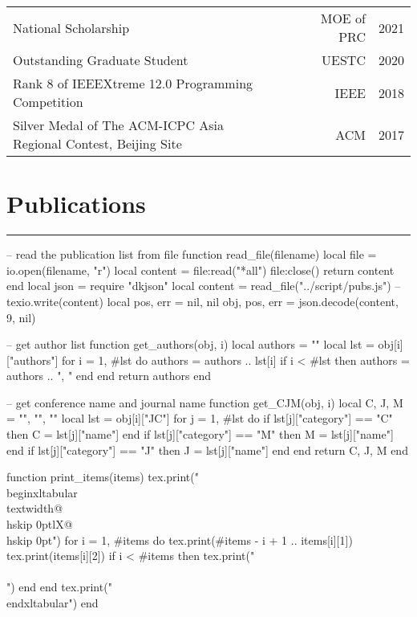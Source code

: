 \documentclass{article}
\begin{document}
\begin{tabularx}{\textwidth}{@{\hskip 0pt}lXr@{\hskip 1em}r@{\hskip 0pt}}
  National Scholarship & & MOE of PRC & 2021  \\
  Outstanding Graduate Student & & UESTC & 2020 \\
  Rank 8 of IEEEXtreme 12.0 Programming Competition & & IEEE & 2018 \\
  Silver Medal of The ACM-ICPC Asia Regional Contest, Beijing Site & & ACM & 2017
\end{tabularx}

\section*{Publications}
\vspace{-1em} \hrule \vspace{1em}

\begin{luacode}
  -- read the publication list from file
  function read_file(filename)
    local file = io.open(filename, "r")
    local content = file:read("*all")
    file:close()
    return content
  end
  local json = require "dkjson"
  local content = read_file("../script/pubs.js")
  -- texio.write(content)
  local pos, err = nil, nil
  obj, pos, err = json.decode(content, 9, nil)
\end{luacode}


\begin{luacode}
  -- get author list
  function get_authors(obj, i) 
    local authors = ""
    local lst = obj[i]["authors"]
    for i = 1, #lst do
      authors = authors .. lst[i]
      if i < #lst then
        authors = authors .. ", "
      end
    end
    return authors
  end

  -- get conference name and journal name
  function get_CJM(obj, i)
    local C, J, M = "", "", "" 
    local lst = obj[i]["JC"]
    for j = 1, #lst do
      if lst[j]["category"] == "C" then
        C = lst[j]["name"]
      end
      if lst[j]["category"] == "M" then
        M = lst[j]["name"]
      end
      if lst[j]["category"] == "J" then
        J = lst[j]["name"]
      end
    end
    return C, J, M
  end

  function print_items(items)
    tex.print("\\begin{xltabular}{\\textwidth}{@{\\hskip 0pt}lX@{\\hskip 0pt}}")
    for i = 1, #items do
      tex.print(#items - i + 1 .. items[i][1])
      tex.print(items[i][2])
      if i < #items then
        tex.print("\\\\")
      end
    end
    tex.print("\\end{xltabular}")
  end
\end{luacode}
\end{document}
